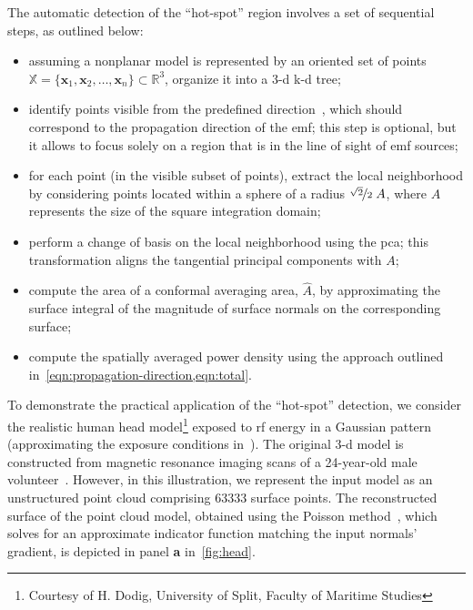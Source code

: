 The automatic detection of the ``hot-spot'' region involves a set of sequential steps, as outlined below:
\begin{itemize}
    \item assuming a nonplanar model is represented by an oriented set of points $\mathbb{X} = \{ \mathbf{x}_1, \mathbf{x}_2, \dots, \mathbf{x}_n \} \subset \mathbb{R}^3$, organize it into a \gls{3-d} \gls{k-d} tree;
    \item identify points visible from the predefined direction~\cite{Katz2007Direct}, which should correspond to the propagation direction of the \gls{emf}; this step is optional, but it allows to focus solely on a region that is in the line of sight of \gls{emf} sources;
    \item for each point (in the visible subset of points), extract the local neighborhood by considering points located within a sphere of a radius $\nicefrac{\sqrt{2}}{2} \; A$, where $A$ represents the size of the square integration domain;
    \item perform a change of basis on the local neighborhood using the \gls{pca}; this transformation aligns the tangential principal components with $A$;
    \item compute the area of a conformal averaging area, $\hat A$, by approximating the surface integral of the magnitude of surface normals on the corresponding surface;
    \item compute the spatially averaged power density using the approach outlined in~\cref{eqn:propagation-direction,eqn:total}.
\end{itemize} 

To demonstrate the practical application of the ``hot-spot'' detection, we consider the realistic human head model\footnote{Courtesy of H. Dodig, University of Split, Faculty of Maritime Studies} exposed to \gls{rf} energy in a Gaussian pattern~\cite{Foster2016Thermal} (approximating the exposure conditions in~\cite{Colombi2015Implications}).
The original \gls{3-d} model is constructed from magnetic resonance imaging scans of a \num{24}-year-old male volunteer~\cite{Laakso2015Intersubject}.
However, in this illustration, we represent the input model as an unstructured point cloud comprising \num{63333} surface points.
The reconstructed surface of the point cloud model, obtained using the Poisson method~\cite{Kazhdan2006Poisson}, which solves for an approximate indicator function matching the input normals' gradient, is depicted in panel \textbf{a} in~\cref{fig:head}.


